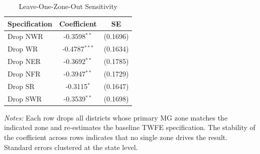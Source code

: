 \begin{table}[htbp]
\centering
\begin{threeparttable}
\caption{Leave-One-Zone-Out Sensitivity}
\label{tab:loo}
\begin{tabular}{lcc}
\hline\hline
Specification & Coefficient & SE \\
\hline
Drop NWR & -0.3598$^{**}$ & (0.1696) \\
Drop WR & -0.4787$^{***}$ & (0.1634) \\
Drop NER & -0.3692$^{**}$ & (0.1785) \\
Drop NFR & -0.3947$^{**}$ & (0.1729) \\
Drop SR & -0.3115$^{*}$ & (0.1647) \\
Drop SWR & -0.3539$^{**}$ & (0.1698) \\
\hline\hline
\end{tabular}
\begin{tablenotes}[flushleft]
\small
\item \textit{Notes:} Each row drops all districts whose primary MG zone matches the indicated zone and re-estimates the baseline TWFE specification. The stability of the coefficient across rows indicates that no single zone drives the result. Standard errors clustered at the state level.
\end{tablenotes}
\end{threeparttable}
\end{table}

